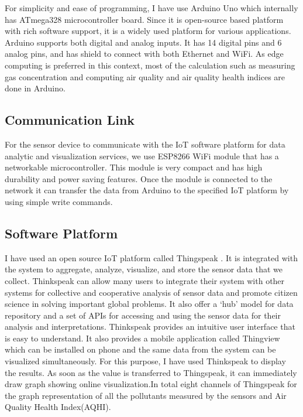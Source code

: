 \documentclass[11pt]{article}
\begin{document}
 For simplicity and ease of programming, I have use Arduino Uno which internally has ATmega328 microcontroller board. Since it is open-source based platform with rich software support, it is a widely used platform for various applications. Arduino supports both digital and analog inputs. It has 14 digital pins and 6 analog pins, and has shield to connect with both Ethernet and WiFi. As edge computing is preferred in this context, most of the calculation such as measuring gas concentration and computing air quality and air quality health indices are done in Arduino.



 \subsection{Communication Link}
 
 For the sensor device to communicate with the IoT software platform for data analytic and visualization services, we use ESP8266 WiFi module that has a networkable microcontroller. This module is very compact and has high durability and power saving features. Once the module is connected to the network it can transfer the data from Arduino to the specified IoT platform by using simple write commands.


\subsection{Software Platform}

 I have used an open source IoT platform called Thingspeak \cite{Thingspeak}. It is integrated with the system to aggregate, analyze, visualize, and store the sensor data that we collect\cite{Thingspeak}. Thinkspeak can allow many users to integrate their system with other systems for collective and cooperative analysis of sensor data and promote citizen science in solving important global problems. It also offer a ‘hub’ model for data repository and a set of APIs for accessing and using the sensor data for their analysis and interpretations. Thinkspeak provides an intuitive user interface that is easy to understand. It also provides a mobile application called Thingview which can be installed on phone and the same data from the system can be visualized simultaneously.
For this purpose, I have used Thinkspeak to display the results. As soon as the value is transferred to Thingspeak, it can immediately draw graph showing online visualization.In total eight channels of Thingspeak for the graph representation of all the pollutants measured by the sensors and Air Quality Health Index(AQHI).
\end{document}
